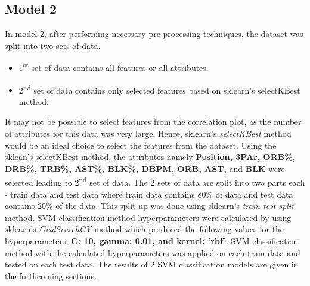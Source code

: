 \documentclass[format=sigconf]{acmart}
\begin{document}
\subsection{Model 2}
In model 2, after performing necessary pre-processing techniques, the dataset was split into two sets of data.
\begin{itemize}
    \item 1\textsuperscript{st} set of data contains all features or all attributes.
    \item 2\textsuperscript{nd} set of data contains only selected features based on sklearn's selectKBest method.
\end{itemize}
It may not be possible to select features from the correlation plot, as the number of attributes for this data was very large.
Hence, sklearn's \textit{selectKBest} method would be an ideal choice to select the features from the dataset.
Using the sklean's selectKBest method, the attributes namely \textbf{Position, 3PAr, ORB\%, DRB\%, TRB\%, AST\%, BLK\%, DBPM, ORB, AST,}
and \textbf{BLK} were selected leading to 2\textsuperscript{nd} set of data.
The 2 sets of data are split into two parts each - train data and test data where train data contains 80\% of data and test data contains
20\% of the data. This split up was done using sklearn's \textit{train-test-split} method. SVM classification method hyperparameters 
were calculated by using sklearn's \textit{GridSearchCV} method which produced the following values for the hyperparameters,
\textbf{C: 10, gamma: 0.01, and kernel: 'rbf'}. SVM classification method with the calculated hyperparameters
was applied on each train data and tested on each test data. The results of 2 SVM classification 
models are given in the forthcoming sections.
\end{document}
